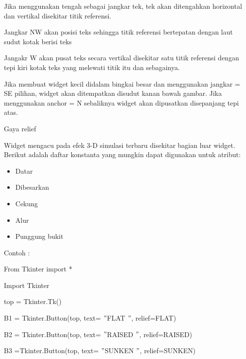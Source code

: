 \documentclass [12pt,a4paper,notitlepage,oneside,bahasa]{article}
\begin{document}
 \par
\vspace{12pt}
Jika menggunakan tengah sebagai jangkar tek, tek akan ditengahkan horizontal dan vertikal disekitar titik referensi. \par
Jangkar NW akan posisi teks sehingga titik referensi bertepatan dengan laut sudut kotak berisi teks \par
Jangakr W akan pusat teks secara vertikal disekitar satu titik referensi dengan tepi kiri kotak teks yang melewati titik itu dan sebagainya. \par
Jika membuat widget kecil didalam bingkai besar dan menggunakan jangkar = SE pilihan, widget akan ditempatkan disudut kanan bawah gambar. Jika menggunakan anchor = N sebaliknya widget akan dipusatkan disepanjang tepi atas. \par
\noindent 
Gaya relief \par
\noindent 
Widget mengacu pada efek 3-D simulasi terbaru disekitar bagian luar widget. Berikut adalah daftar konstanta yang mungkin dapat digunakan untuk atribut: \par
\noindent 
\begin{itemize}
\item Datar \par
\noindent 
\item Dibesarkan \par
\noindent 
\item Cekung \par
\noindent 
\item Alur \par
\noindent 
\item Punggung bukit\end{itemize}
 \par
\vspace{12pt}
Contoh : \par
{\fontsize{10pt}{10pt}\selectfont From Tkinter import *} \par
{\fontsize{10pt}{10pt}\selectfont Import Tkinter} \par
\vspace{10pt}
{\fontsize{10pt}{10pt}\selectfont top = Tkinter.Tk()} \par
{\fontsize{10pt}{10pt}\selectfont B1 = Tkinter.Button(top, text= $ " $FLAT $ " $, relief=FLAT)} \par
{\fontsize{10pt}{10pt}\selectfont B2 = Tkinter.Button(top, text= $ " $RAISED $ " $, relief=RAISED)} \par
{\fontsize{10pt}{10pt}\selectfont B3 =Tkinter.Button(top, text= $ " $SUNKEN $ " $, relief=SUNKEN)} \par
\end{document}
